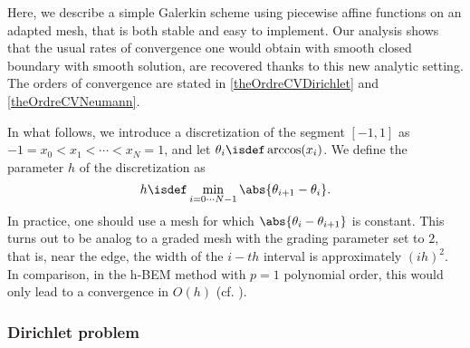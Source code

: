 \documentclass[a4paper]{article}
\begin{document}
	Here, we describe a simple Galerkin scheme using piecewise affine functions on an adapted mesh, that is both stable and easy to implement. Our analysis shows that the usual rates of convergence one would obtain with smooth closed boundary with smooth solution, are recovered thanks to this new analytic setting. The orders of convergence are stated in \autoref{theOrdreCVDirichlet} and \autoref{theOrdreCVNeumann}. 
	
	In what follows, we introduce a discretization of the segment $[-1,1]$ as $-1 = x_0 < x_1 < \cdots < x_N = 1$, and let $\theta_i \isdef \arccos(x_i)$. We define the parameter $h$ of the discretization as 
	\[ h \isdef \min_{i=0\cdots N-1} \abs{\theta_{i+1} - \theta_{i}}.\]
	In practice, one should use a mesh for which $\abs{\theta_i - \theta_{i+1}}$ is constant. This turns out to be analog to a graded mesh with the grading parameter set to $2$, that is, near the edge, the width of the $i-th$ interval is approximately $(ih)^2$. In comparison, in the h-BEM method with $p=1$ polynomial order, this would only lead to a convergence in $O(h)$ (cf. \cite[Theorem 1.3]{postell1990h}).
	
	\subsubsection{Dirichlet problem}
	
\end{document}
